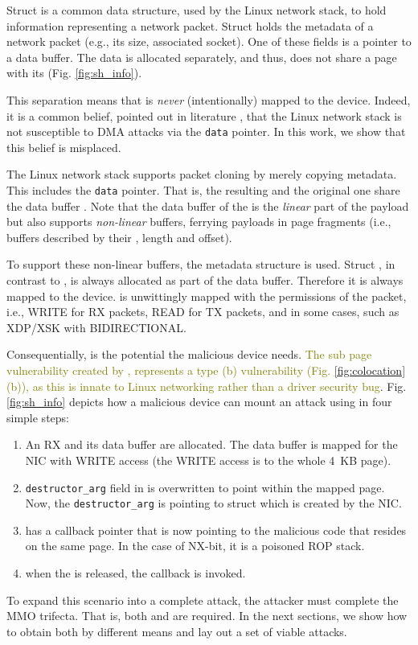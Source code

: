 Struct \skb{} is a common data structure, used by the Linux network stack, to hold information representing a network packet. Struct \skb{} holds the metadata of a network packet (e.g., its size, associated socket). One of these fields is a pointer to a data buffer. The data is allocated separately, and thus, does not share a page with its \skb{} (Fig. \ref{fig:sh_info}). 

This separation means that \skb{} is \emph{never} (intentionally) mapped to the device. Indeed, it is a common belief, pointed out in literature \cite{thunder}, that the Linux network stack is not susceptible to DMA attacks via the \texttt{data} pointer. In this work, we show that this belief is misplaced.

The Linux network stack supports packet cloning by merely copying \skb{} metadata. This includes the \texttt{data} pointer. That is, the resulting \skb{} and the original one share the data buffer \cite{drivers2005linux}. Note that the data buffer of the \skb{} is the \emph{linear} part of the payload but \skb{} also supports \emph{non-linear} buffers, ferrying payloads in page fragments (i.e., buffers described by their \page{}, length and offset). 

To support these non-linear buffers, the \shinfo{} metadata structure is used.
Struct \shinfo{}, in contrast to \skb{}, is always allocated as part of the data buffer. Therefore it is always mapped to the device. \shinfo is unwittingly mapped with the permissions of the packet, i.e., WRITE for RX packets, READ for TX packets, and in some cases, such as XDP/XSK \cite{xdp} with BIDIRECTIONAL.

Consequentially, \shinfo{} is the potential \oportunity{} the malicious device needs. \textcolor{olive}{The sub page vulnerability created by \shinfo{}, represents a type (b) vulnerability (Fig. \ref{fig:colocation} (b)), as this is innate to Linux networking rather than a driver security bug}. Fig. \ref{fig:sh_info} depicts how a malicious device can mount an attack using \shinfo{} in four simple steps:
\begin{enumerate}[label=(\alph*)]
    \item An RX \skb{} and its data buffer are allocated. The data buffer is mapped for the NIC with WRITE access (the WRITE access is to the whole 4~KB page). 
    \item \texttt{destructor\_arg} field in \shinfo{} is overwritten to point within the mapped page. Now, the \texttt{destructor\_arg} is pointing to struct \uarg{} which is created by the NIC.
    \item \uarg{} has a callback pointer that is now pointing to the malicious code that resides on the same page. In the case of NX-bit, it is a poisoned ROP stack.
    \item when the \skb{} is released, the callback is invoked.
\end{enumerate}
To expand this scenario into a complete attack, the attacker must complete the MMO trifecta. That is, both \means{} and \oportunity{} are required. In the next sections, we show how to obtain both by different means and lay out a set of viable attacks.

